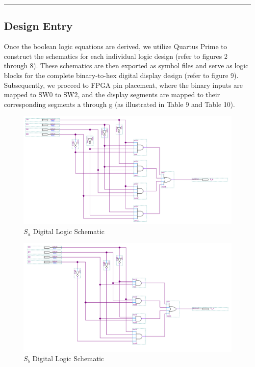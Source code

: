 \documentclass{article}
\begin{document}
\vspace{5mm}
\hrule

\subsection*{\textcolor{mycolor}{Design Entry}}
Once the boolean logic equations are derived, we utilize Quartus Prime to construct the schematics for each individual logic design (refer to figures 2 through 8). These schematics are then exported as symbol files and serve as logic blocks for the complete binary-to-hex digital display design (refer to figure 9). Subsequently, we proceed to FPGA pin placement, where the binary inputs are mapped to SW0 to SW2, and the display segments are mapped to their corresponding segments a through g (as illustrated in Table 9 and Table 10).
\begin{figure}[H]
  \centering
  \includegraphics[width=1\textwidth]{S_a_schem.png}
  \caption{$S_a$ Digital Logic Schematic}
\end{figure}

\begin{figure}[H]
  \centering
  \includegraphics[width=1\textwidth]{S_b_schem.png}
  \caption{$S_b$ Digital Logic Schematic}
\end{figure}
\end{document}
